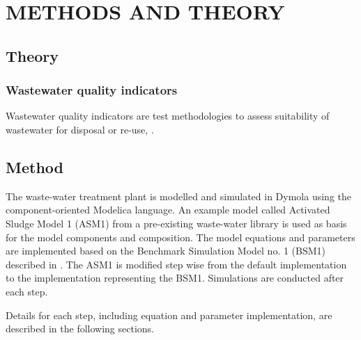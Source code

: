 \section*{METHODS AND THEORY }\label{sec:METHODS}

\subsection*{Theory}
\subsubsection{Wastewater quality indicators}
Wastewater quality indicators are test methodologies to assess suitability of wastewater for disposal or re-use, \cite{qi}.

\subsection*{Method}
The waste-water treatment plant is modelled and simulated in Dymola using the component-oriented Modelica language. An example model called Activated Sludge Model 1 (ASM1) from a pre-existing waste-water library is used as basis for the model components and composition. The model equations and parameters are implemented based on the Benchmark Simulation Model no. 1 (BSM1) described in \cite{alex2008}. The ASM1 is modified step wise from the default implementation to the implementation representing the BSM1. Simulations are conducted after each step.

Details for each step, including equation and parameter implementation, are described in the following sections.